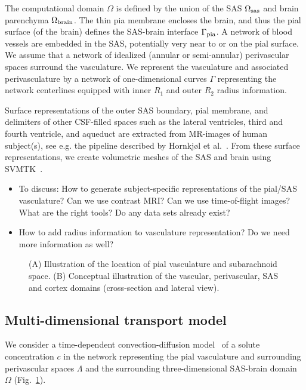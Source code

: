 \documentclass[fleqn,10pt]{wlscirep}
\begin{document}
The computational domain $\Omega$ is defined by the union of the SAS $\Omega_{\rm sas}$ and brain parenchyma $\Omega_{\rm brain}$. The thin pia membrane encloses the brain, and thus the pial surface (of the brain) defines the SAS-brain interface $\Gamma_{\rm pia}$. A network of blood vessels are embedded in the SAS, potentially very near to or on the pial surface. We assume that a network of idealized (annular or semi-annular) perivascular spaces surround the vasculature. We represent the vasculature and associated perivasculature by a network of one-dimensional curves $\Gamma$ representing the network centerlines equipped with inner $R_1$ and outer $R_2$ radius information. 

Surface representations of the outer SAS boundary, pial membrane, and delimiters of other CSF-filled spaces such as the lateral ventricles, third and fourth ventricle, and aqueduct are extracted from MR-images of human subject(s), see e.g. the pipeline described by Hornkjøl et al.~\cite{hornkjol2022csf}. From these surface representations, we create volumetric meshes of the SAS and brain using SVMTK~\cite{mardal2022mathematical}. 

\begin{itemize}
    \item To discuss: How to generate subject-specific representations of the pial/SAS vasculature? Can we use contrast MRI? Can we use time-of-flight images? What are the right tools? Do any data sets already exist? 
    \item How to add radius information to vasculature representation? Do we need more information as well?
\end{itemize}


\begin{figure}
\caption{(A) Illustration of the location of pial vasculature and subarachnoid space. (B) Conceptual illustration of the vascular, perivascular, SAS and cortex domains (cross-section and lateral view).}
\label{fig:concept}
\end{figure}

\subsection*{Multi-dimensional transport model}

We consider a time-dependent convection-diffusion model~\cite{masri2023modelling} of a solute concentration $c$ in the network representing the pial vasculature and surrounding perivascular spaces $\Lambda$ and the surrounding three-dimensional SAS-brain domain $\Omega$ (Fig.~\ref{fig:concept}). 
\end{document}
